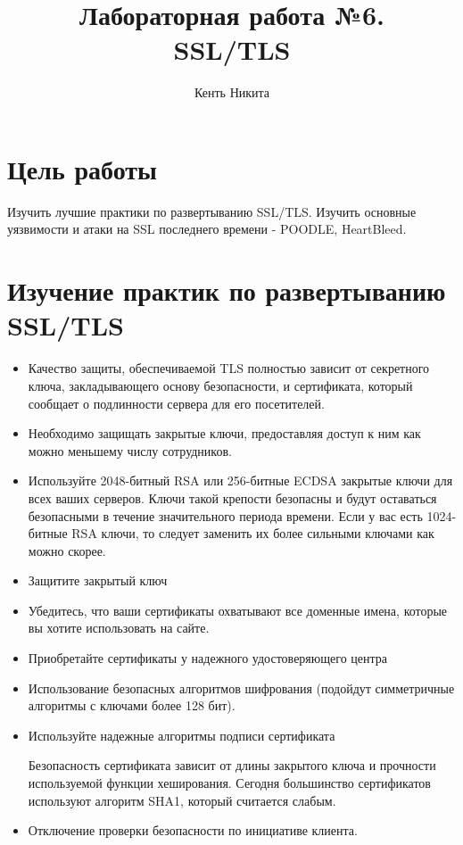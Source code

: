 \documentclass[10pt,a4paper]{report}
\author{Кенть Никита}
\title{Лабораторная работа №6.\\
	SSL/TLS}
\begin{document}
	\maketitle
	\renewcommand{\thesection}{\arabic{section}}
	\tableofcontents
	\pagebreak
	
	\setcounter{totalnumber}{10}
	\setcounter{topnumber}{10}
	\setcounter{bottomnumber}{10}
	\renewcommand{\topfraction}{1}
	\renewcommand{\textfraction}{0}
	
	\section{Цель работы}
		Изучить лучшие практики по развертыванию SSL/TLS.
		Изучить основные уязвимости и атаки на SSL последнего времени - POODLE, 
		HeartBleed.
	\section{Изучение практик по развертыванию SSL/TLS}
		\begin{itemize}
			\item Качество защиты, обеспечиваемой TLS полностью зависит от секретного ключа, закладывающего основу безопасности, и сертификата, который сообщает о подлинности сервера для его посетителей.
			
			\item Необходимо защищать закрытые ключи, предоставляя доступ к ним как 
			можно меньшему числу сотрудников.
			
			\item Используйте 2048-битный RSA или 256-битные ECDSA закрытые ключи для всех ваших серверов. Ключи такой крепости безопасны и будут оставаться безопасными в течение значительного периода времени. Если у вас есть 1024-битные RSA ключи, то следует заменить их более сильными ключами как можно скорее.
			
			\item Защитите закрытый ключ
			
			\item Убедитесь, что ваши сертификаты охватывают все доменные имена, которые вы хотите использовать на сайте. 
			
			\item Приобретайте сертификаты у надежного удостоверяющего центра
			
			\item Использование безопасных алгоритмов шифрования (подойдут 
			симметричные алгоритмы с ключами более 128 бит).
			
			\item  Используйте надежные алгоритмы подписи сертификата

Безопасность сертификата зависит от длины закрытого ключа и прочности используемой функции хеширования. Сегодня большинство сертификатов используют алгоритм SHA1, который считается слабым.

			
			\item Отключение проверки безопасности по инициативе клиента.
		\end{itemize}
\end{document}
